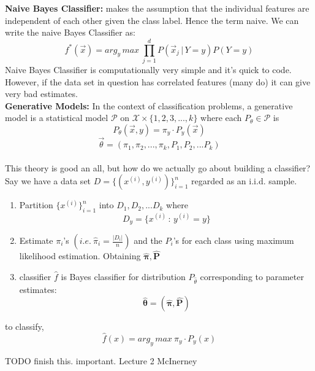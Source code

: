 \documentclass[10pt]{article}
\begin{document}
			\noindent \textbf{Naive Bayes Classifier:} makes the assumption that the individual features 
			are independent of each other given the class label. Hence the term naive. We can write 
			the naive Bayes Classifier as:
			$$ f^*(\vec x) =  arg_y \, max \ \prod_{j=1}^{d}P(\vec x_j \, | \, Y=y)P(Y = y)$$
			Naive Bayes Classifier is computationally very simple and it's quick to code. However, if the data
			set in question has correlated features (many do) it can give very bad estimates. \\
			
			\noindent \textbf{Generative Models:} In the context of classification problems, a generative 
			model is a statistical model $\mathcal P$ on $\mathcal X \times \{1,2,3, ..., k\}$ where each
			$P_\theta \in \mathcal P$ is 
			$$P_\theta(\vec x,y) = \pi_y \cdot P_y(\vec x) $$
			$$ \vec \theta = (\pi_1, \pi_2, ..., \pi_k, P_1, P_2, ...P_k)$$
			\\
			This theory is good an all, but how do we actually go about building a classifier? Say we have
			a data set $D = \{ (x^{(i)}, y^{(i)})\}_{i=1}^n$ regarded as an i.i.d. sample.
			\begin{enumerate}
				\item Partition $\{x^{(i)}\}_{i=1}^{n}$ into $D_1, D_2, ... D_k$ where
				$$ D_y = \{x^{(i)} \, : \, y^{(i)} = y\}$$
				\item Estimate $\pi_i$'s $ (i.e. \ \hat \pi_i = \frac{|D_i|}{n})$ and the $P_i$'s for each class
				using maximum likelihood estimation. Obtaining $\hat{\pmb{\pi}}, \hat{\pmb{P}}$
				\item classifier $\hat f$ is Bayes classifier for distribution $P_{\hat \theta}$ corresponding
				to parameter estimates:
				$$ \hat{\pmb{\theta}} = (\hat{\pmb{\pi}}, \hat{\pmb{P}}) $$
			\end{enumerate}
			
			\noindent to classify,
			$$ \hat{f}(x) = arg_y \, max \ \pi_y \cdot P_y(x)$$
			
			TODO finish this. important. Lecture 2 McInerney 
\end{document}

